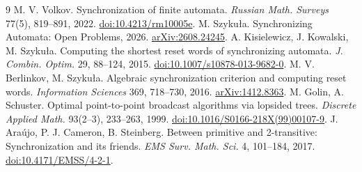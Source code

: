 \documentclass[11pt]{article}
\begin{document}
\begin{thebibliography}{9}
 M. V. Volkov.
Synchronization of finite automata.
\emph{Russian Math. Surveys} 77(5), 819--891, 2022.
\href{https://www.mathnet.ru/eng/rm10005}{doi:10.4213/rm10005e}.
 M. Szyku{\l}a.
Synchronizing Automata: Open Problems, 2026.
\href{https://arxiv.org/abs/2608.24245}{arXiv:2608.24245}.
 A. Kisielewicz, J. Kowalski, M. Szyku{\l}a.
Computing the shortest reset words of synchronizing automata.
\emph{J. Combin. Optim.} 29, 88--124, 2015.
\href{https://doi.org/10.1007/s10878-013-9682-0}{doi:10.1007/s10878-013-9682-0}.
 M. V. Berlinkov, M. Szyku{\l}a.
Algebraic synchronization criterion and computing reset words.
\emph{Information Sciences} 369, 718--730, 2016.
\href{https://arxiv.org/abs/1412.8363}{arXiv:1412.8363}.
 M. Golin, A. Schuster.
Optimal point-to-point broadcast algorithms via lopsided trees.
\emph{Discrete Applied Math.} 93(2--3), 233--263, 1999.
\href{https://doi.org/10.1016/S0166-218X(99)00107-9}{doi:10.1016/S0166-218X(99)00107-9}.
 J. Ara{\'u}jo, P. J. Cameron, B. Steinberg.
Between primitive and 2-transitive: Synchronization and its friends.
\emph{EMS Surv. Math. Sci.} 4, 101--184, 2017.
\href{https://doi.org/10.4171/EMSS/4-2-1}{doi:10.4171/EMSS/4-2-1}.
\end{thebibliography}
\end{document}
